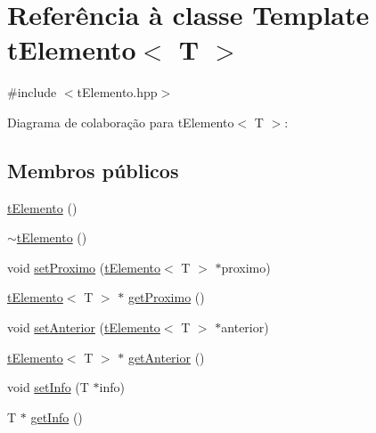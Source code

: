 \hypertarget{a00006}{\section{Referência à classe Template t\+Elemento$<$ T $>$}
\label{a00006}
}


{\ttfamily \#include $<$t\+Elemento.\+hpp$>$}



Diagrama de colaboração para t\+Elemento$<$ T $>$\+:
\subsection*{Membros públicos}
\begin{DoxyCompactItemize}
\item 
\hyperlink{a00006_ad8dc84de43eca107440039b37e188de6}{t\+Elemento} ()
\item 
\hyperlink{a00006_a2b83968c3cdf56f521b6faff78068bc8}{$\sim$t\+Elemento} ()
\item 
void \hyperlink{a00006_aa9f5f970a2de51063c78e54229c35867}{set\+Proximo} (\hyperlink{a00006}{t\+Elemento}$<$ T $>$ $\ast$proximo)
\item 
\hyperlink{a00006}{t\+Elemento}$<$ T $>$ $\ast$ \hyperlink{a00006_acfbfbaaedb5a662a999f655c171b50f1}{get\+Proximo} ()
\item 
void \hyperlink{a00006_a484d3f94a793fc00e935a2d442019ac4}{set\+Anterior} (\hyperlink{a00006}{t\+Elemento}$<$ T $>$ $\ast$anterior)
\item 
\hyperlink{a00006}{t\+Elemento}$<$ T $>$ $\ast$ \hyperlink{a00006_a467573ea5ebe5fdd5e5739f62d8ecc7d}{get\+Anterior} ()
\item 
void \hyperlink{a00006_a20c8ed616c72b00387650d06a8368834}{set\+Info} (T $\ast$info)
\item 
T $\ast$ \hyperlink{a00006_af7e39d1f741ccf80a012660530a32e1b}{get\+Info} ()
\end{DoxyCompactItemize}


